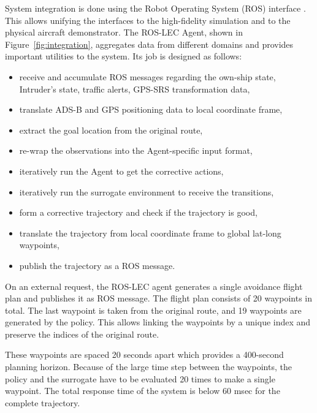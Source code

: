 System integration is done using the Robot Operating System (ROS) interface \cite{quigley2009ros}. This allows unifying the interfaces to the high-fidelity simulation and to the physical aircraft demonstrator.
The ROS-LEC Agent, shown in Figure~\ref{fig:integration}, aggregates data from different domains and provides important utilities to the system. Its job is designed as follows: 
\begin{itemize}
	\item receive and accumulate ROS messages regarding the own-ship state,
	Intruder's state, traffic alerts, GPS-SRS transformation data,
	\item translate ADS-B and GPS positioning data to local coordinate frame,
	\item extract the goal location from the original route,
	\item re-wrap the observations into the Agent-specific input format,
	\item iteratively run the Agent to get the corrective actions,
	\item iteratively run the surrogate environment to receive the transitions,
	\item form a corrective trajectory and check if the trajectory is good,
	\item translate the trajectory from local coordinate frame to global lat-long waypoints,
	\item publish the trajectory as a ROS message.
\end{itemize}

On an external request, the ROS-LEC agent generates a single avoidance flight plan and publishes it as ROS message. The flight plan consists of 20 waypoints in total. The last waypoint is taken from the original route, and 19 waypoints are generated by the policy. This allows linking the waypoints by a unique index and preserve the indices of the original route.

These waypoints are spaced 20 seconds apart which provides a 400-second planning horizon. 
Because of the large time step between the waypoints, the policy and the surrogate have to be evaluated 20 times to make a single waypoint. The total response time of the system is below 60 msec for the complete trajectory.

